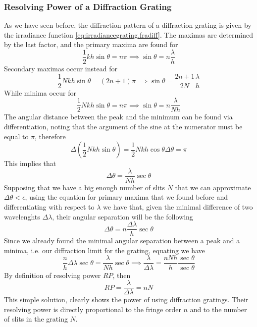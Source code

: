 \documentclass[../electromagnetism.tex]{subfiles}
\begin{document}
\subsubsection{Resolving Power of a Diffraction Grating}
As we have seen before, the diffraction pattern of a diffraction grating is given by the irradiance function \eqref{eq:irradiancegrating.fradiff}. The maximas are determined by the last factor, and the primary maxima are found for
\begin{equation}
	\frac{1}{2}kh\sin\theta=n\pi\implies\sin\theta=n\frac{\lambda}{h}
	\label{eq:primarymaximadg.fradiff}
\end{equation}
Secondary maximas occur instead for
\begin{equation}
	\frac{1}{2}Nkh\sin\theta=\left( 2n+1 \right)\pi\implies\sin\theta=\frac{2n+1}{2N}\frac{\lambda}{h}
	\label{eq:secondarymaximadg.fradiff}
\end{equation}
While minima occur for
\begin{equation}
	\frac{1}{2}Nkh\sin\theta=n\pi\implies\sin\theta=n\frac{\lambda}{Nh}
	\label{eq:minimadg.fradiff}
\end{equation}
The angular distance between the peak and the minimum can be found via differentiation, noting that the argument of the sine at the numerator must be equal to $\pi$, therefore
\begin{equation*}
	\Delta\left( \frac{1}{2}Nkh\sin\theta \right)=\frac{1}{2}Nkh\cos\theta\Delta\theta=\pi
\end{equation*}
This implies that
\begin{equation}
	\Delta\theta=\frac{\lambda}{Nh}\sec\theta
	\label{eq:minangledg.fradiff}
\end{equation}
Supposing that we have a big enough number of slits $N$ that we can approximate $\Delta\theta<\epsilon$, using the equation for primary maxima that we found before and differentiating with respect to $\lambda$ we have that, given the minimal difference of two wavelenghts $\Delta\lambda$, their angular separation will be the following
\begin{equation}
	\Delta\theta=n\frac{\Delta\lambda}{h}\sec\theta
	\label{eq:minangsepwldg.fradiff}
\end{equation}
Since we already found the minimal angular separation between a peak and a minima, i.e. our diffraction limit for the grating, equating we have
\begin{equation*}
	\frac{n}{h}\Delta\lambda\sec\theta=\frac{\lambda}{Nh}\sec\theta\implies\frac{\lambda}{\Delta\lambda}=\frac{nNh}{h}\frac{\sec\theta}{\sec\theta}
\end{equation*}
By definition of resolving power $RP$, then 
\begin{equation}
	RP=\frac{\lambda}{\Delta\lambda}=nN
	\label{eq:resolvingpowergrating.fradiff}
\end{equation}
This simple solution, clearly shows the power of using diffraction gratings. Their resolving power is directly proportional to the fringe order $n$ and to the number of slits in the grating $N$.
\end{document}
